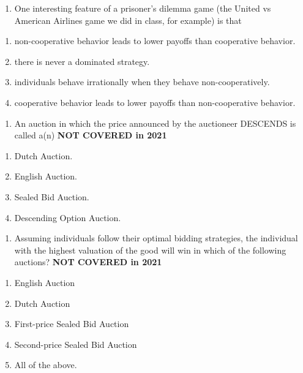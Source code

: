 \documentclass[11pt,]{article}
\providecommand{\tightlist}{%
  \setlength{\itemsep}{0pt}\setlength{\parskip}{0pt}}
\begin{document}
\begin{enumerate}
\def\labelenumi{\arabic{enumi})}
\setcounter{enumi}{17}
\tightlist
\item
  One interesting feature of a prisoner's dilemma game (the United vs
  American Airlines game we did in class, for example) is that
\end{enumerate}

\begin{enumerate}
\def\labelenumi{\Alph{enumi})}
\tightlist
\item
  non-cooperative behavior leads to lower payoffs than cooperative
  behavior.
\item
  there is never a dominated strategy.
\item
  individuals behave irrationally when they behave non-cooperatively.
\item
  cooperative behavior leads to lower payoffs than non-cooperative
  behavior.
\end{enumerate}

\begin{enumerate}
\def\labelenumi{\arabic{enumi})}
\setcounter{enumi}{18}
\tightlist
\item
  An auction in which the price announced by the auctioneer DESCENDS is
  called a(n) \textbf{NOT COVERED in 2021}
\end{enumerate}

\begin{enumerate}
\def\labelenumi{\Alph{enumi})}
\tightlist
\item
  Dutch Auction.
\item
  English Auction.
\item
  Sealed Bid Auction.
\item
  Descending Option Auction.
\end{enumerate}

\begin{enumerate}
\def\labelenumi{\arabic{enumi})}
\setcounter{enumi}{19}
\tightlist
\item
  Assuming individuals follow their optimal bidding strategies, the
  individual with the highest valuation of the good will win in which of
  the following auctions? \textbf{NOT COVERED in 2021}
\end{enumerate}

\begin{enumerate}
\def\labelenumi{\Alph{enumi})}
\tightlist
\item
  English Auction
\item
  Dutch Auction
\item
  First-price Sealed Bid Auction
\item
  Second-price Sealed Bid Auction
\item
  All of the above.
\end{enumerate}
\end{document}
